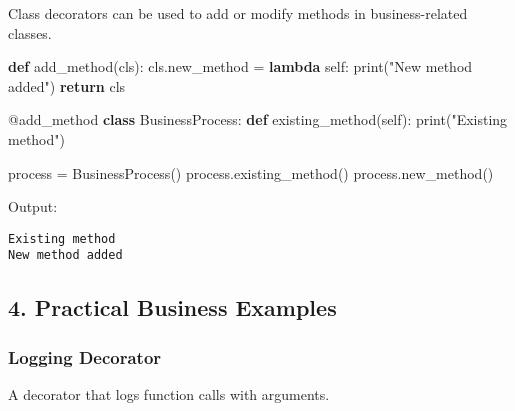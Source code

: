 \documentclass[
  letterpaper,
  DIV=11,
  numbers=noendperiod]{scrreprt}
\newenvironment{Shaded}{\begin{snugshade}}{\end{snugshade}}
\newcommand{\AttributeTok}[1]{\textcolor[rgb]{0.40,0.45,0.13}{#1}}
\newcommand{\BuiltInTok}[1]{\textcolor[rgb]{0.00,0.23,0.31}{#1}}
\newcommand{\ControlFlowTok}[1]{\textcolor[rgb]{0.00,0.23,0.31}{\textbf{#1}}}
\newcommand{\KeywordTok}[1]{\textcolor[rgb]{0.00,0.23,0.31}{\textbf{#1}}}
\newcommand{\NormalTok}[1]{\textcolor[rgb]{0.00,0.23,0.31}{#1}}
\newcommand{\OperatorTok}[1]{\textcolor[rgb]{0.37,0.37,0.37}{#1}}
\newcommand{\StringTok}[1]{\textcolor[rgb]{0.13,0.47,0.30}{#1}}
\newcommand{\VariableTok}[1]{\textcolor[rgb]{0.07,0.07,0.07}{#1}}
\begin{document}
Class decorators can be used to add or modify methods in
business-related classes.

\begin{Shaded}
\begin{Highlighting}[]
\KeywordTok{def}\NormalTok{ add\_method(cls):}
\NormalTok{    cls.new\_method }\OperatorTok{=} \KeywordTok{lambda} \VariableTok{self}\NormalTok{: }\BuiltInTok{print}\NormalTok{(}\StringTok{"New method added"}\NormalTok{)}
    \ControlFlowTok{return}\NormalTok{ cls}

\AttributeTok{@add\_method}
\KeywordTok{class}\NormalTok{ BusinessProcess:}
    \KeywordTok{def}\NormalTok{ existing\_method(}\VariableTok{self}\NormalTok{):}
        \BuiltInTok{print}\NormalTok{(}\StringTok{"Existing method"}\NormalTok{)}

\NormalTok{process }\OperatorTok{=}\NormalTok{ BusinessProcess()}
\NormalTok{process.existing\_method()}
\NormalTok{process.new\_method()}
\end{Highlighting}
\end{Shaded}

Output:

\begin{verbatim}
Existing method
New method added
\end{verbatim}

\subsection{4. Practical Business
Examples}\label{practical-business-examples}

\subsubsection{Logging Decorator}\label{logging-decorator}

A decorator that logs function calls with arguments.
\end{document}
